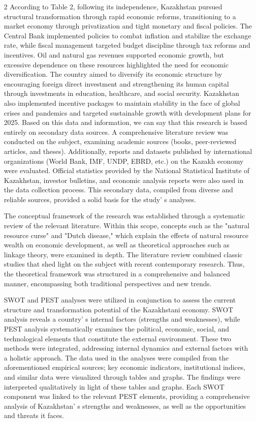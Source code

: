 \begin{multicols}{2}
According to Table 2, following its independence, Kazakhstan pursued
structural transformation through rapid economic reforms, transitioning
to a market economy through privatization and tight monetary and fiscal
policies. The Central Bank implemented policies to combat inflation and
stabilize the exchange rate, while fiscal management targeted budget
discipline through tax reforms and incentives. Oil and natural gas
revenues supported economic growth, but excessive dependence on these
resources highlighted the need for economic diversification. The country
aimed to diversify its economic structure by encouraging foreign direct
investment and strengthening its human capital through investments in
education, healthcare, and social security. Kazakhstan also implemented
incentive packages to maintain stability in the face of global crises
and pandemics and targeted sustainable growth with development plans for
2025. Based on this data and information, we can say that this research is
based entirely on secondary data sources. A comprehensive literature
review was conducted on the subject, examining academic sources (books,
peer-reviewed articles, and theses). Additionally, reports and datasets
published by international organizations (World Bank, IMF, UNDP, EBRD,
etc.) on the Kazakh economy were evaluated. Official statistics provided
by the National Statistical Institute of Kazakhstan, investor bulletins,
and economic analysis reports were also used in the data collection
process. This secondary data, compiled from diverse and reliable
sources, provided a solid basis for the study' s
analyses.

The conceptual framework of the research was established through a
systematic review of the relevant literature. Within this scope,
concepts such as the "natural resource curse" and "Dutch disease," which
explain the effects of natural resource wealth on economic development,
as well as theoretical approaches such as linkage theory, were examined
in depth. The literature review combined classic studies that shed light
on the subject with recent contemporary research. Thus, the theoretical
framework was structured in a comprehensive and balanced manner,
encompassing both traditional perspectives and new trends.

SWOT and PEST analyses were utilized in conjunction to assess the
current structure and transformation potential of the Kazakhstani
economy. SWOT analysis reveals a country' s internal
factors (strengths and weaknesses), while PEST analysis systematically
examines the political, economic, social, and technological elements
that constitute the external environment. These two methods were
integrated, addressing internal dynamics and external factors with a
holistic approach. The data used in the analyses were compiled from the
aforementioned empirical sources; key economic indicators, institutional
indices, and similar data were visualized through tables and graphs. The
findings were interpreted qualitatively in light of these tables and
graphs. Each SWOT component was linked to the relevant PEST elements,
providing a comprehensive analysis of Kazakhstan' s
strengths and weaknesses, as well as the opportunities and threats it
faces.


\end{multicols}
